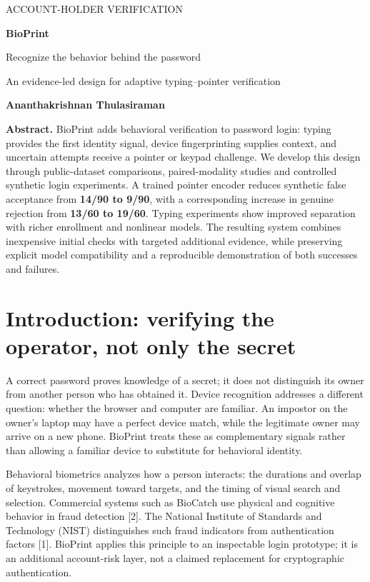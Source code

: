 \documentclass[10pt,a4paper]{article}
\newcommand{\note}[1]{\begin{tcolorbox}[colback=pale,colframe=teal,boxrule=0pt,leftrule=2pt,arc=0pt,left=7pt,right=7pt,top=5pt,bottom=5pt]#1\end{tcolorbox}}
\begin{document}
\thispagestyle{fancy}
{\sffamily\color{teal}\small ACCOUNT-HOLDER VERIFICATION\par}
{\sffamily\bfseries\color{navy}\fontsize{28}{32}\selectfont BioPrint\par}
{\sffamily\color{navy}\Large Recognize the behavior behind the password\par}
{\large An evidence-led design for adaptive typing--pointer verification\par}
{\normalsize\textbf{Ananthakrishnan Thulasiraman}\par}
\vspace{4pt}
\note{\textbf{Abstract.} BioPrint adds behavioral verification to password login: typing provides the first identity signal, device fingerprinting supplies context, and uncertain attempts receive a pointer or keypad challenge. We develop this design through public-dataset comparisons, paired-modality studies and controlled synthetic login experiments. A trained pointer encoder reduces synthetic false acceptance from \textbf{14/90 to 9/90}, with a corresponding increase in genuine rejection from \textbf{13/60 to 19/60}. Typing experiments show improved separation with richer enrollment and nonlinear models. The resulting system combines inexpensive initial checks with targeted additional evidence, while preserving explicit model compatibility and a reproducible demonstration of both successes and failures.}

\section{Introduction: verifying the operator, not only the secret}
A correct password proves knowledge of a secret; it does not distinguish its owner from another person who has obtained it. Device recognition addresses a different question: whether the browser and computer are familiar. An impostor on the owner's laptop may have a perfect device match, while the legitimate owner may arrive on a new phone. BioPrint treats these as complementary signals rather than allowing a familiar device to substitute for behavioral identity.

Behavioral biometrics analyzes how a person interacts: the durations and overlap of keystrokes, movement toward targets, and the timing of visual search and selection. Commercial systems such as BioCatch use physical and cognitive behavior in fraud detection [2]. The National Institute of Standards and Technology (NIST) distinguishes such fraud indicators from authentication factors [1]. BioPrint applies this principle to an inspectable login prototype; it is an additional account-risk layer, not a claimed replacement for cryptographic authentication.
\end{document}
